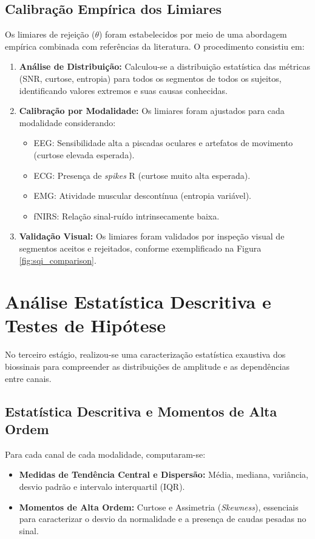 \subsection{Calibração Empírica dos Limiares}
\label{sec:calibracao_limiares}

Os limiares de rejeição ($\theta$) foram estabelecidos por meio de uma abordagem 
empírica combinada com referências da literatura. O procedimento consistiu em:

\begin{enumerate}
    \item \textbf{Análise de Distribuição:} Calculou-se a distribuição estatística 
    das métricas (SNR, curtose, entropia) para todos os segmentos de todos os 
    sujeitos, identificando valores extremos e suas causas conhecidas.
    
    \item \textbf{Calibração por Modalidade:} Os limiares foram ajustados para cada 
    modalidade considerando:
    \begin{itemize}
        \item EEG: Sensibilidade alta a piscadas oculares e artefatos de movimento 
        (curtose elevada esperada).
        \item ECG: Presença de \textit{spikes} R (curtose muito alta esperada).
        \item EMG: Atividade muscular descontínua (entropia variável).
        \item fNIRS: Relação sinal-ruído intrinsecamente baixa.
    \end{itemize}
    
    \item \textbf{Validação Visual:} Os limiares foram validados por inspeção 
    visual de segmentos aceitos e rejeitados, conforme exemplificado na 
    Figura \ref{fig:sqi_comparison}.
\end{enumerate}

\section{Análise Estatística Descritiva e Testes de Hipótese}
\label{sec:metodo_estatistica}

No terceiro estágio, realizou-se uma caracterização estatística exaustiva dos biossinais para compreender as distribuições de amplitude e as dependências entre canais.

\subsection{Estatística Descritiva e Momentos de Alta Ordem}
Para cada canal de cada modalidade, computaram-se:
\begin{itemize}
    \item \textbf{Medidas de Tendência Central e Dispersão:} Média, mediana, variância, desvio padrão e intervalo interquartil (IQR).
    \item \textbf{Momentos de Alta Ordem:} Curtose e Assimetria (\textit{Skewness}), essenciais para caracterizar o desvio da normalidade e a presença de caudas pesadas no sinal.
\end{itemize}

